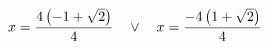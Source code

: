\documentclass[preview]{standalone}
\begin{document}
\begin{align*}
\special{dvisvgm:raw <g id='unique000'>}x=\frac{4 \left(-1 + \sqrt{2}\right)}{4} \quad \lor \quad x=\frac{- 4 \left(1 + \sqrt{2}\right)}{4}\special{dvisvgm:raw </g>}
\end{align*}
\end{document}
